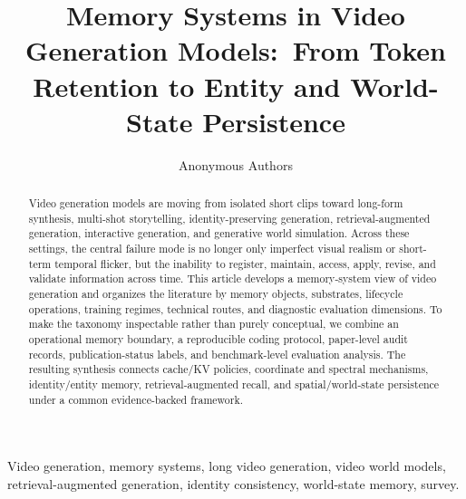 \documentclass[journal]{IEEEtran}
\title{Memory Systems in Video Generation Models:\ From Token Retention to Entity and World-State Persistence}
\author{Anonymous Authors}
\begin{document}
\maketitle

\begin{abstract}
Video generation models are moving from isolated short clips toward long-form synthesis, multi-shot storytelling, identity-preserving generation, retrieval-augmented generation, interactive generation, and generative world simulation. Across these settings, the central failure mode is no longer only imperfect visual realism or short-term temporal flicker, but the inability to register, maintain, access, apply, revise, and validate information across time. This article develops a memory-system view of video generation and organizes the literature by memory objects, substrates, lifecycle operations, training regimes, technical routes, and diagnostic evaluation dimensions. To make the taxonomy inspectable rather than purely conceptual, we combine an operational memory boundary, a reproducible coding protocol, paper-level audit records, publication-status labels, and benchmark-level evaluation analysis. The resulting synthesis connects cache/KV policies, coordinate and spectral mechanisms, identity/entity memory, retrieval-augmented recall, and spatial/world-state persistence under a common evidence-backed framework.
\end{abstract}

\begin{IEEEkeywords}
Video generation, memory systems, long video generation, video world models, retrieval-augmented generation, identity consistency, world-state memory, survey.
\end{IEEEkeywords}
















\balance


\end{document}

